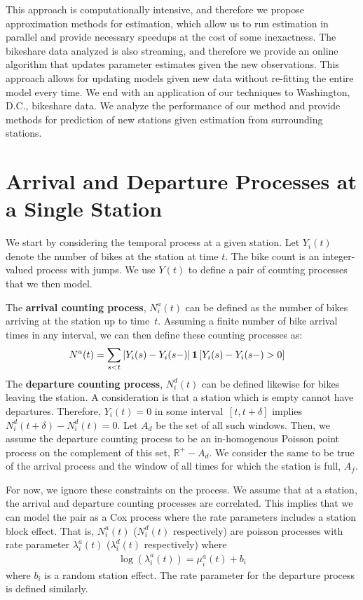 \documentclass{acm_proc_article-sp}
\begin{document}
This approach is computationally intensive, and therefore we propose approximation methods for estimation, which allow us to run estimation in parallel and provide necessary speedups at the cost of some inexactness.  The bikeshare data analyzed is also streaming, and therefore we provide an online algorithm that updates parameter estimates given the new observations.  This approach allows for updating models given new data without re-fitting the entire model every time.  We end with an application of our techniques to Washington, D.C., bikeshare data.  We analyze the performance of our method and provide methods for prediction of new stations given estimation from surrounding stations.


\section{Arrival and Departure Processes at a Single Station}

We start by considering the temporal process at a given station.  Let $Y_i (t)$ denote the number of bikes at the station at time $t$.  The bike count is an integer-valued process with jumps.  We use $Y(t)$ to define a pair of counting processes that we then model.

The {\bf arrival counting process}, $N_i^{a} (t)$ can be defined as the number of bikes arriving at the station up to time~$t$.  Assuming a finite number of bike arrival times in any interval, we can then define these counting processes as:
\begin{align}
N^{a} (t) &= \sum_{s < t} \left | Y_i (s) - Y_i (s-) \right | {\bf 1} \left[ Y_i (s) - Y_i (s-)  > 0 \right] 
\end{align}
The {\bf departure counting process}, $N_i^{d} (t)$ can be defined likewise for bikes leaving the station.  A consideration is that a station which is empty cannot have departures.  Therefore, $Y_i (t) = 0$ in some interval~$[t, t+\delta]$ implies $N_i^{d} (t+\delta) -N_i^{d} (t) = 0$.   Let $A_{d}$ be the set of all such windows.  Then, we assume the departure counting process to be an in-homogenous Poisson point process on the complement of this set, $\mathbb{R}^{+} - A_{d}$.  We consider the same to be true of the arrival process and the window of all times for which the station is full, $A_{f}$.

For now, we ignore these constraints on the process.  We assume that at a station, the arrival and departure counting processes are correlated.  This implies that we can model the pair as a Cox process where the rate parameters includes a station block effect. That is, $N_i^{a} (t)$ ($N_i^{d} (t)$ respectively) are poisson processes with rate parameter $\lambda_i^{a} (t)$ ($\lambda_i^{d} (t)$ respectively) where
\begin{align}
\log \left( \lambda_i^{a} (t) \right) = \mu^{a}_i(t) + b_i
\end{align}
\noindent where $b_i$ is a random station effect.  The rate parameter for the departure process is defined similarly.
\end{document}
